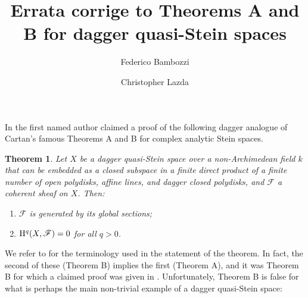 \documentclass[11pt,leqno,a4paper]{amsart}
\title{Errata corrige to Theorems A and B for dagger quasi-Stein spaces}
\newtheorem{theorem}{Theorem}
\theoremstyle{remark}
\theoremstyle{definition}
\numberwithin{equation}{theorem}
\def\sF{{\mathscr F}}
\begin{document}
	



\author{Federico Bambozzi}
\address{ Dipartimento di Matematica ``Tullio Levi-Civita" \\ University of Padova \\
Via Trieste 63 \\ 35121 \\
Padova \\ Italy}

\author{Christopher Lazda}
       \address{Department of Mathematics\\ Harrison Building \\ Streatham Campus
 \\ University of Exeter \\ North Park Road \\ Exeter  \\ EX4 4QF \\ United Kingdom }

%
	
	\maketitle

In \cite{Bam} the first named author claimed a proof of the following dagger analogue of Cartan's famous Theorems A and B for complex analytic Stein spaces.

\begin{theorem} \label{thm:main}
Let $X$ be a dagger quasi-Stein space over a non-Archimedean field $k$ that can be embedded as a closed subspace
in a finite direct product of a finite number of open polydisks, affine lines, and dagger closed polydisks, and $\sF$ a coherent sheaf on $X$. Then:
\begin{enumerate} \item $\sF$ is generated by its global sections;
\item ${\rm H}^q(X,\sF)=0$ for all $q>0$.
\end{enumerate}
\end{theorem}

We refer to \cite{Bam} for the terminology used in the statement of the theorem. In fact, the second of these (Theorem B) implies the first (Theorem A), and it was Theorem B for which a claimed proof was given in \cite{Bam}. Unfortunately, Theorem B is false for what is perhaps the main non-trivial example of a dagger quasi-Stein space: 
\end{document}
